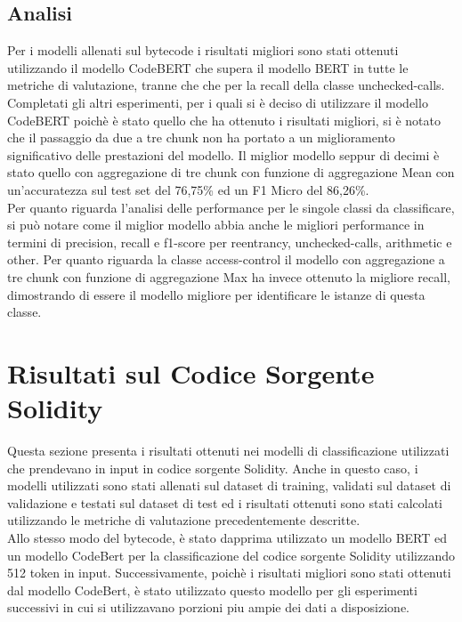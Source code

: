 \documentclass[../../Thesis.tex]{subfiles}
\begin{document}
\subsection{Analisi}
Per i modelli allenati sul bytecode i risultati migliori sono stati ottenuti utilizzando il modello CodeBERT che supera il modello BERT in tutte le metriche di valutazione, tranne che che per la recall della classe unchecked-calls. Completati gli altri esperimenti, per i quali si è deciso di utilizzare il modello CodeBERT poichè è stato quello che ha ottenuto i risultati migliori, si è notato che il passaggio da due a tre chunk non ha portato a un miglioramento significativo delle prestazioni del modello. Il miglior modello seppur di decimi è stato quello con aggregazione di tre chunk con funzione di aggregazione Mean con un'accuratezza sul test set del 76,75\% ed un F1 Micro del 86,26\%.\\
Per quanto riguarda l'analisi delle performance per le singole classi da classificare, si può notare come il miglior modello abbia anche le migliori performance in termini di precision, recall e f1-score per reentrancy, unchecked-calls, arithmetic e other. Per quanto riguarda la classe access-control il modello con aggregazione a tre chunk con funzione di aggregazione Max ha invece ottenuto la migliore recall, dimostrando di essere il modello migliore per identificare le istanze di questa classe. 


\section{Risultati sul Codice Sorgente Solidity}

Questa sezione presenta i risultati ottenuti nei modelli di classificazione utilizzati che prendevano in input in codice sorgente Solidity. Anche in questo caso, i  modelli utilizzati sono stati allenati sul dataset di training, validati sul dataset di validazione e testati sul dataset di test ed i risultati ottenuti sono stati calcolati utilizzando le metriche di valutazione precedentemente descritte.\\
Allo stesso modo del bytecode, è stato dapprima utilizzato un modello BERT ed un modello CodeBert per la classificazione del codice sorgente Solidity utilizzando 512 token in input. Successivamente, poichè i risultati migliori sono stati ottenuti dal modello CodeBert,  è stato utilizzato questo modello per gli esperimenti successivi in cui si utilizzavano porzioni piu ampie dei dati a disposizione.\\
\end{document}
